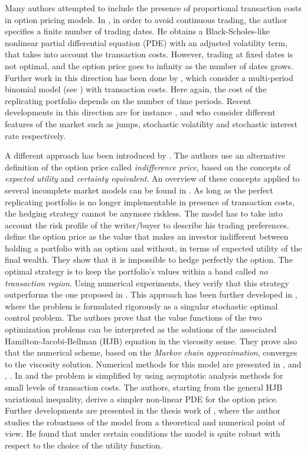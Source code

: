 Many authors attempted to include the presence of proportional transaction costs in option pricing models.
In \cite{Le85}, in order to avoid continuous trading, the author specifies 
a finite number of trading dates. He obtains a Black-Scholes-like
nonlinear partial differential equation (PDE) with an adjusted volatility term, that takes into account the transaction costs. 
However, trading at fixed dates is not optimal, and the option price goes to infinity as the number of dates grows.
Further work in this direction has been done by \cite{BoVo92}, which consider a multi-period binomial model (see \cite{CRR79})
with transaction costs. Here again, the cost of the replicating portfolio depends on the number of time periods. 
Recent developments in this direction are for instance \cite{Mocio07}, \cite{FlMaSe14} and \cite{Sengu14} 
who consider different features of the market such as jumps, stochastic volatility and stochastic interest rate respectively.  

A different approach has been introduced by \cite{HoNe89}. The authors use an alternative definition of the option price
called \emph{indifference price}, based on the concepts of \emph{expected utility} and \emph{certainty equivalent}.  
An overview of these concepts applied to several incomplete market models can be found in \cite{Carmona}.
As long as the perfect replicating portfolio is no longer implementable in presence of transaction costs, the 
hedging strategy cannot be anymore riskless. 
The model has to take into account the risk profile of the writer/buyer to describe his trading preferences.
\cite{HoNe89} define the option price as the value that makes an investor indifferent between holding a portfolio with an option
and without, in terms of expected utility of the final wealth.
They show that it is impossible to hedge perfectly the option. The optimal strategy is to keep the portfolio's values within
a band called \emph{no transaction region}. Using numerical experiments, they verify that this strategy outperforms the one 
proposed in \cite{Le85}.
This approach has been further developed in \cite{DaPaZa93}, where the problem is formulated rigorously as a singular 
stochastic optimal control problem. The authors prove that the value functions of the two optimization problems
can be interpreted as the solutions of the associated Hamilton-Jacobi-Bellman (HJB) equation in the viscosity sense. 
They prove also that the numerical scheme, based on the \emph{Markov chain approximation}, converges to the viscosity solution.
Numerical methods for this model are presented in \cite{DaPa94}, \cite{ClHo97} and \cite{Mon03}, \cite{Mon04}.
In \cite{WhWi97} and \cite{BaSo98} the problem is simplified by using asymptotic analysis methods for small levels of 
transaction costs. The authors, starting from the general HJB variational inequality, derive a simpler non-linear PDE for the option price. 
Further developments are presented in the thesis work of \cite{Damgaard}, where the author 
studies the robustness of the model from a theoretical and numerical point of view. 
He found that under certain conditions the model is quite robust with respect to the choice of the utility function. 

